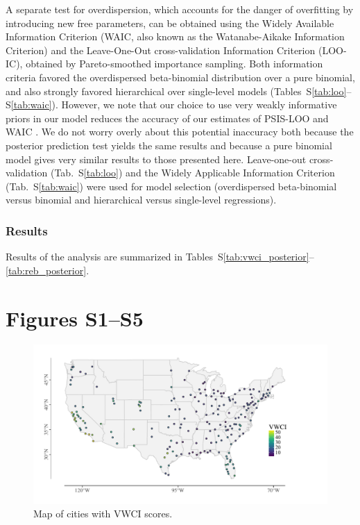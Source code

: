 \documentclass[draft]{agujournal}
\begin{document}
A separate test for overdispersion, which accounts for the danger of overfitting by introducing new free parameters, can be obtained using the Widely Available Information Criterion (WAIC, also known as the Watanabe-Aikake Information Criterion) and the Leave-One-Out cross-validation Information Criterion (LOO-IC), obtained by Pareto-smoothed importance sampling.
Both information criteria favored the overdispersed beta-binomial distribution over a pure binomial, and also strongly favored hierarchical over single-level models (Tables~S\ref{tab:loo}--S\ref{tab:waic}). However, we note that our choice to use very weakly informative priors in our model reduces the accuracy of our estimates of PSIS-LOO and WAIC \cite{vehtari_loo_2016}. We do not worry overly about this potential inaccuracy both because the posterior prediction test yields the same results and because a pure binomial model gives very similar results to those presented here.
\else
Leave-one-out cross-validation (Tab.~S\ref{tab:loo}) and the Widely Applicable Information Criterion (Tab.~S\ref{tab:waic}) were used for model selection (overdispersed beta-binomial versus binomial and hierarchical versus single-level regressions).
\fi

\subsubsection*{Results}

Results of the analysis are summarized in Tables~S\ref{tab:vwci_posterior}--\ref{tab:reb_posterior}.

\section*{Figures S1--S5}

\begin{figure}[htp]
\includegraphics[width=6.5in,angle=0]{figures_si/vwci_map-1} \caption[Map of cities with VWCI scores]{Map of cities with VWCI scores.}\label{fig:vwci_map}
\end{figure}
\end{document}

